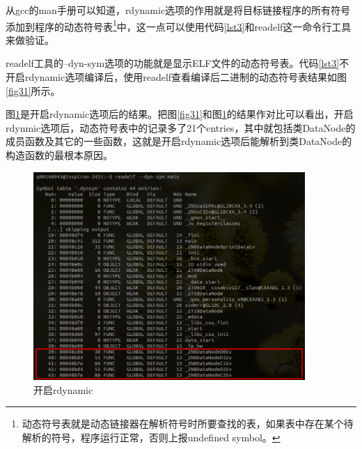 \documentclass[a4paper, 12pt, titlepage]{article}
\begin{document}
从gcc的man手册可以知道，rdynamic选项的作用就是将目标链接程序的所有符号添加到程序的动态符号表\footnote{动态符号表就是动态链接器在解析符号时所要查找的表，如果表中存在某个待解析的符号，程序运行正常，否则上报undefined symbol。}中，这一点可以使用代码\ref{lst3}和readelf这一命令行工具来做验证。

readelf工具的--dyn-sym选项的功能就是显示ELF文件的动态符号表。代码\ref{lst3}不开启rdynamic选项编译后，使用readelf查看编译后二进制的动态符号表结果如图\ref{fig31}所示。

图\ref{fig32}是开启rdynamic选项后的结果。把图\ref{fig31}和图\ref{fig32}的结果作对比可以看出，开启rdynmic选项后，动态符号表中的记录多了21个entries，其中就包括类DataNode的成员函数及其它的一些函数，这就是开启rdynamic选项后能解析到类DataNode的构造函数的最根本原因。
\begin{figure}[!htb]
  \setlength{\abovecaptionskip}{0pt}
  \centering
  \includegraphics[width=0.92\textwidth]{rdynamic.png}
  \caption{开启rdynamic}
  \label{fig32}
\end{figure}
\end{document}
